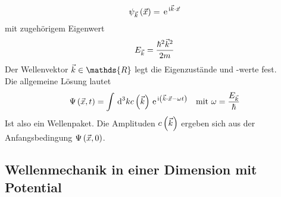 \begin{itemize}
	\begin{equation}
		\psi_{\vK}\of{\vX} = \e{\mI\vK\cdot\vX}
	\end{equation}
	mit zugehörigem Eigenwert
	\begin{equation}
		E_{\vK} = \frac{\hbar^2\vK^2}{2m}
	\end{equation}
	Der Wellenvektor $\vK \in \mathds{R}$ legt die Eigenzustände und -werte fest.\\
	Die allgemeine Lösung lautet
	\begin{equation}
		\Psi\of{\vX,t} = \int\dn{k}{3} c\of{\vK} \e{\mI\norBra{\vK\cdot\vX - \omega t}} \quad \text{mit } \omega = \frac{E_{\vK}}{\hbar}
	\end{equation}
	Ist also ein Wellenpaket. Die Amplituden $c\of{\vK}$ ergeben sich aus der Anfangsbedingung $\Psi\of{\vX,0}$.
\end{itemize}

\subsection{Wellenmechanik in einer Dimension mit Potential}

